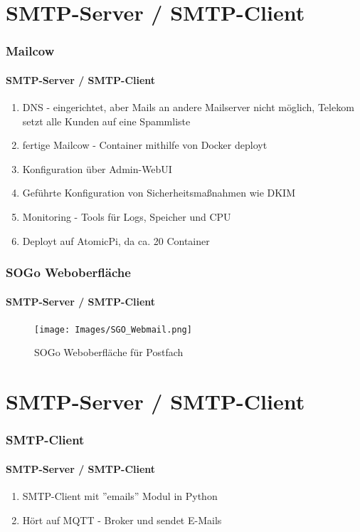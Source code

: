 \documentclass[aspectratio=169]{beamer}
\begin{document}
\section{SMTP-Server / SMTP-Client}
\begin{frame}
	\frametitle{Mailcow}
	\framesubtitle{SMTP-Server / SMTP-Client}
	\begin{enumerate}
		\item DNS - eingerichtet, aber Mails an andere Mailserver nicht möglich, Telekom setzt alle Kunden auf eine Spammliste
    \item fertige Mailcow - Container mithilfe von Docker deployt
    \item Konfiguration über Admin-WebUI
    \item Geführte Konfiguration von Sicherheitsmaßnahmen wie DKIM
    \item Monitoring - Tools für Logs, Speicher und CPU
    \item Deployt auf AtomicPi, da ca. 20 Container
	\end{enumerate}
\end{frame}

\begin{frame}
	\frametitle{SOGo Weboberfläche}
	\framesubtitle{SMTP-Server / SMTP-Client}
	\begin{figure}
		\begin{minipage}[t]{1\textwidth}
			\centering
			\texttt{[image: Images/SGO\_Webmail.png]}
		\end{minipage}
		\caption{SOGo Weboberfläche für Postfach}
	\end{figure}
\end{frame}

\section{SMTP-Server / SMTP-Client}
\begin{frame}
	\frametitle{SMTP-Client}
	\framesubtitle{SMTP-Server / SMTP-Client}
	\begin{enumerate}
    \item SMTP-Client mit ''emails'' Modul in Python
    \item Hört auf MQTT - Broker und sendet E-Mails
	\end{enumerate}
\end{frame}
\end{document}
